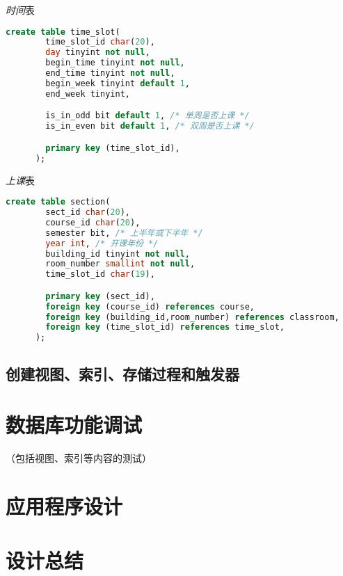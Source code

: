 \documentclass{myreport}
\begin{document}
    \emph{时间}表
    \begin{lstlisting}[language=sql]
      create table time_slot(
        time_slot_id char(20),
        day tinyint not null,
        begin_time tinyint not null,
        end_time tinyint not null,
        begin_week tinyint default 1,
        end_week tinyint,

        is_in_odd bit default 1, /* 单周是否上课 */
        is_in_even bit default 1, /* 双周是否上课 */

        primary key (time_slot_id),
      );
    \end{lstlisting}

    \emph{上课}表
    \begin{lstlisting}[language=sql]
      create table section(
        sect_id char(20),
        course_id char(20),
        semester bit, /* 上半年或下半年 */
        year int, /* 开课年份 */
        building_id tinyint not null,
        room_number smallint not null,
        time_slot_id char(19),

        primary key (sect_id),
        foreign key (course_id) references course,
        foreign key (building_id,room_number) references classroom,
        foreign key (time_slot_id) references time_slot,
      );

    \end{lstlisting}

  \subsection{创建视图、索引、存储过程和触发器}




\section{数据库功能调试}
（包括视图、索引等内容的测试）

\section{应用程序设计}

\section{设计总结}





\nocite{silberschatz1997database} %
\nocite{sqldbm} %
\nocite{pyqt5} %
\nocite{drawio}
\end{document}

